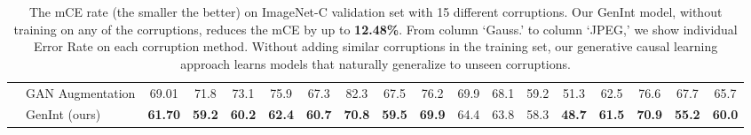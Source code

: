 \documentclass[final]{cvpr}
\begin{document}
\begin{table*}[t]
\begin{tabular}{ll|c|ccc|cccc|cccc|cccc}
           & GAN Augmentation \cite{CAS} & 69.01 & 71.8&	73.1&	75.9&	67.3&	82.3&	67.5&	76.2&	69.9&	68.1&	59.2&	51.3&	62.5&	76.6&	67.7&	65.7 \\
           
           & GenInt (ours) & \textbf{61.70} & \textbf{59.2}&	\textbf{60.2}&	\textbf{62.4}&	\textbf{60.7}&	\textbf{70.8}&	\textbf{59.5}&	\textbf{69.9}&	64.4&	63.8&	58.3&	\textbf{48.7}&	\textbf{61.5}&	\textbf{70.9}&	\textbf{55.2}&	\textbf{60.0} \\
           
         \bottomrule
    \end{tabular}
\vspace{3px}
\caption{The mCE  rate (the smaller the better) on ImageNet-C validation \cite{imgnet-C} set with 15 different corruptions. Our GenInt model, without training on any of the corruptions, reduces the mCE by up to \textbf{12.48\%}. From column `Gauss.' to column `JPEG,' we show individual Error Rate on each corruption method. Without  adding similar corruptions in the training set, our generative causal learning approach learns models that naturally generalize to unseen corruptions.}
\label{tab:imagenet-C}
\end{table*}
\end{document}
